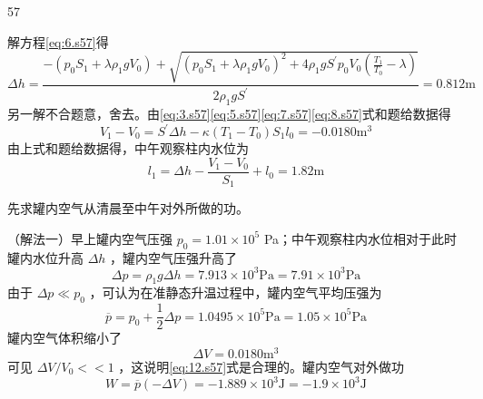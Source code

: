 \begin{solution}{57}
\begin{subsolution}
\begin{equation}
            \label{eq:7.s57}
        \end{equation}
        解方程\eqref{eq:6.s57}得
        \begin{equation}
            \Delta h = \frac {- \left(p _ {0} S _ {1} + \lambda \rho_{1} g V _ {0}\right) + \sqrt {\left(p _ {0} S _ {1} + \lambda \rho_{1} g V _ {0}\right)^{2} + 4 \rho_{1} g S^{\prime} p _ {0} V _ {0} \left(\frac {T _ {1}}{T _ {0}} - \lambda\right)}}{2 \rho_{1} g S^{\prime}} = 0.812 \mathrm{m}
            \label{eq:8.s57}
        \end{equation}
        另一解不合题意，舍去。由\eqref{eq:3.s57}\eqref{eq:5.s57}\eqref{eq:7.s57}\eqref{eq:8.s57}式和题给数据得
        \begin{equation}
            V _ {1} - V _ {0} = S^{\prime} \Delta h - \kappa (T _ {1} - T _ {0}) S _ {1} l _ {0} = - 0.0180 \mathrm{m}^{3}
            \label{eq:9.s57}
        \end{equation}
        由上式和题给数据得，中午观察柱内水位为
        \begin{equation}
            l _ {1} = \Delta h - \frac {V _ {1} - V _ {0}}{S _ {1}} + l _ {0} = 1.82 \mathrm{m}
            \label{eq:10.s57}
        \end{equation}
    \end{subsolution}
    \begin{subsolution}
        先求罐内空气从清晨至中午对外所做的功。

        （解法一）早上罐内空气压强 $p_{0}=1.01\times10^{5}$ Pa；中午观察柱内水位相对于此时罐内水位升高 $\Delta h$ ，罐内空气压强升高了
        \begin{equation}
            \Delta p = \rho_{1} g \Delta h = 7.913 \times 10^{3} \mathrm{Pa} = 7.91 \times 10^{3} \mathrm{Pa}
            \label{eq:11.s57}
        \end{equation}
        由于 $\Delta p \ll p_{0}$ ，可认为在准静态升温过程中，罐内空气平均压强为
        \begin{equation}
            \overline{p} = p _ {0} + \frac {1}{2} \Delta p = 1.0495 \times 10^{5} \mathrm{Pa} = 1.05 \times 10^{5} \mathrm{Pa}
            \label{eq:12.s57}
        \end{equation}
        罐内空气体积缩小了
        \begin{equation}
            \Delta V = 0.0180 \mathrm{m}^{3}
            \label{eq:13.s57}
        \end{equation}
        可见 $\Delta V / V_{0} << 1$ ，这说明\eqref{eq:12.s57}式是合理的。罐内空气对外做功
        \begin{equation}
            W = \overline{p} (- \Delta V) = - 1.889 \times 10^{3} \mathrm{J} = - 1.9 \times 10^{3} \mathrm{J}
            \label{eq:14.s57}
        \end{equation}


\end{subsolution}
\end{solution}
